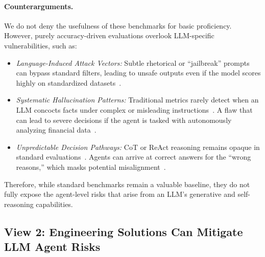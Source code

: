 \paragraph{Counterarguments.}
We do not deny the usefulness of these benchmarks for basic proficiency. However, purely accuracy-driven evaluations overlook LLM-specific vulnerabilities, such as:
\vspace{-5pt}
\begin{itemize}
    \item \emph{Language-Induced Attack Vectors:} Subtle rhetorical or ``jailbreak'' prompts can bypass standard filters, leading to unsafe outputs even if the model scores highly on standardized datasets~\citep{shen2024anything}.
    \item \emph{Systematic Hallucination Patterns:} Traditional metrics rarely detect when an LLM concocts facts under complex or misleading instructions~\citep{kang2023deficiency}. A flaw that can lead to severe decisions if the agent is tasked with autonomously analyzing financial data~\citep{roychowdhury2023hallucination}.
    \item \emph{Unpredictable Decision Pathways:} CoT or ReAct reasoning remains opaque in standard evaluations~\citep{Wei2022ChainOT,yao2022react}. Agents can arrive at correct answers for the ``wrong reasons,'' which masks potential misalignment~\citep{turpin2024language}.
\end{itemize}
Therefore, while standard benchmarks remain a valuable baseline, they do not fully expose the agent-level risks that arise from an LLM's generative and self-reasoning capabilities.

\subsection{View 2: Engineering Solutions Can Mitigate LLM Agent Risks}

